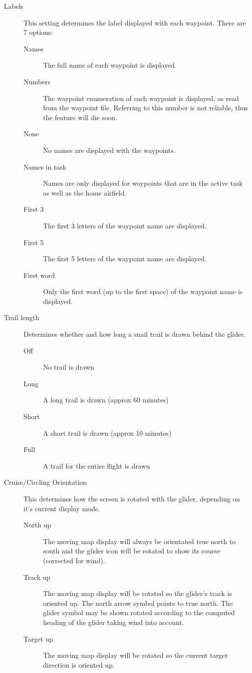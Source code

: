 \begin{description}
\item[Labels] This setting \label{conf:labels} determines the label
displayed with each waypoint. There are 7 options:

\begin{description}
\item[Names] The full name of each waypoint is displayed.
\item[Numbers] The waypoint enumeration of each waypoint is displayed, as read
from the waypoint file. Referring to this number is not reliable, thus the
feature will die soon.
\item[None] No names are displayed with the waypoints.
\item[Names in task] Names are only displayed for waypoints that are in the active task as well as the home airfield.
\item[First 3] The first 3 letters of the waypoint name are displayed.
\item[First 5] The first 5 letters of the waypoint name are displayed.
\item[First word] Only the first word (up to the first space) of the waypoint name is displayed.
\end{description}

\item[Trail length] \label{conf:snailtrail} Determines whether and how long a
snail trail is drawn behind the glider.
\begin{description}
\item[Off] No trail is drawn
\item[Long] A long trail is drawn (approx 60 minutes)
\item[Short] A short trail is drawn (approx 10 minutes) 
\item[Full] A trail for the entire flight is drawn
\end{description}

\item[Cruise/Circling Orientation] \label{conf:orientation} This determines how
the screen is rotated with the glider, depending on it's current display mode.
\begin{description}
\item[North up] The moving map display will always be orientated true north to
south and the glider icon will be rotated to show its course (corrected for
wind).
\item[Track up] The moving map display will be rotated so the glider's track
 is oriented up. The north arrow symbol points to true north. The glider symbol 
 may be shown rotated according to the computed heading of the glider taking wind into account.
\item[Target up] The moving map display will be rotated so the current target
direction is oriented up.
\end{description}


\end{description}
